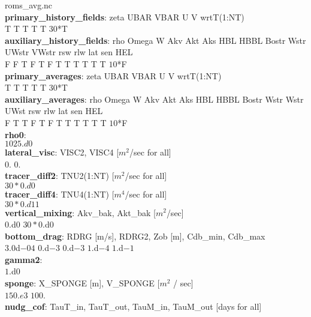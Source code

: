                           roms\_avg.nc \\
\textbf{primary\_history\_fields}: zeta UBAR VBAR  U  V   wrtT(1:NT) \\
                          T    T   T   T  T    $30$*T \\
\textbf{auxiliary\_history\_fields}:   rho Omega  W  Akv  Akt  Aks  HBL HBBL Bostr Wstr UWstr VWstr rsw rlw lat sen HEL \\
                             F   F     T   F    T    F    T   T    T     T    T    T $10$*F \\         
\textbf{primary\_averages}: zeta UBAR VBAR  U  V   wrtT(1:NT) \\
                   T    T    T    T  T   $30$*T      \\
\textbf{auxiliary\_averages}: rho Omega  W  Akv  Akt  Aks  HBL HBBL Bostr Wstr Wstr UWst  rsw rlw lat sen HEL \\
                     F   T     T   F    T    F    T   T    T     T   T    T     $10$*F\\              
\textbf{rho0}: \\
      $1025.d0$ \\
\textbf{lateral\_visc}:   VISC2,    VISC4    [$m^{2}$/sec for all] \\
                 $0.$       $0.$\\
\textbf{tracer\_diff2}: TNU2(1:NT)           [$m^2$/sec for all] \\
               $30*0.d0$ \\
\textbf{tracer\_diff4}: TNU4(1:NT)           [$m^4$/sec for all] \\
               $30*0.d11$ \\
\textbf{vertical\_mixing}: Akv\_bak, Akt\_bak [$m^2$/sec] \\
                   $0.$d$0$    $30*0.$d$0$ \\
\textbf{bottom\_drag}:     RDRG [m/s],  RDRG2,  Zob [m],  Cdb\_min, Cdb\_max \\
                 $3.0$d$-04$      $0.$d$-3$    $0$.d$-3$     $1$.d$-4$    $1$.d$-1$ \\
\textbf{gamma2}: \\
                 $1.$d$0$ \\
\textbf{sponge}:          X\_SPONGE [m],    V\_SPONGE [$m^2$ / sec] \\ 
                   $150.e3$           $100.$ \\
\textbf{nudg\_cof}:    TauT\_in, TauT\_out, TauM\_in, TauM\_out  [days for all]\\
